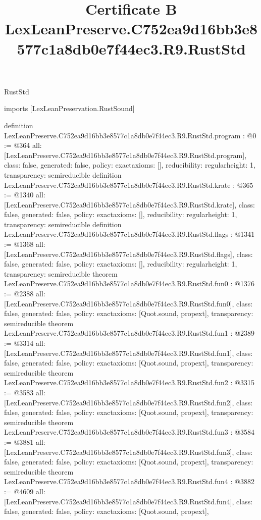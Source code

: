 \begin{lexlean}{RustStd}
\title{Certificate B LexLeanPreserve.C752ea9d16bb3e8577c1a8db0e7f44ec3.R9.RustStd}
\begin{coremodule}
imports [LexLeanPreservation.RustSound]

definition LexLeanPreserve.C752ea9d16bb3e8577c1a8db0e7f44ec3.R9.RustStd.program : @0 := @364 {
  all: [LexLeanPreserve.C752ea9d16bb3e8577c1a8db0e7f44ec3.R9.RustStd.program],
  class: false,
  generated: false,
  policy: exact{axioms: []},
  reducibility: regular{height: 1},
  transparency: semireducible
}
definition LexLeanPreserve.C752ea9d16bb3e8577c1a8db0e7f44ec3.R9.RustStd.krate : @365 := @1340 {
  all: [LexLeanPreserve.C752ea9d16bb3e8577c1a8db0e7f44ec3.R9.RustStd.krate],
  class: false,
  generated: false,
  policy: exact{axioms: []},
  reducibility: regular{height: 1},
  transparency: semireducible
}
definition LexLeanPreserve.C752ea9d16bb3e8577c1a8db0e7f44ec3.R9.RustStd.flags : @1341 := @1368 {
  all: [LexLeanPreserve.C752ea9d16bb3e8577c1a8db0e7f44ec3.R9.RustStd.flags],
  class: false,
  generated: false,
  policy: exact{axioms: []},
  reducibility: regular{height: 1},
  transparency: semireducible
}
theorem LexLeanPreserve.C752ea9d16bb3e8577c1a8db0e7f44ec3.R9.RustStd.fun0 : @1376 := @2388 {
  all: [LexLeanPreserve.C752ea9d16bb3e8577c1a8db0e7f44ec3.R9.RustStd.fun0],
  class: false,
  generated: false,
  policy: exact{axioms: [Quot.sound, propext]},
  transparency: semireducible
}
theorem LexLeanPreserve.C752ea9d16bb3e8577c1a8db0e7f44ec3.R9.RustStd.fun1 : @2389 := @3314 {
  all: [LexLeanPreserve.C752ea9d16bb3e8577c1a8db0e7f44ec3.R9.RustStd.fun1],
  class: false,
  generated: false,
  policy: exact{axioms: [Quot.sound, propext]},
  transparency: semireducible
}
theorem LexLeanPreserve.C752ea9d16bb3e8577c1a8db0e7f44ec3.R9.RustStd.fun2 : @3315 := @3583 {
  all: [LexLeanPreserve.C752ea9d16bb3e8577c1a8db0e7f44ec3.R9.RustStd.fun2],
  class: false,
  generated: false,
  policy: exact{axioms: [Quot.sound, propext]},
  transparency: semireducible
}
theorem LexLeanPreserve.C752ea9d16bb3e8577c1a8db0e7f44ec3.R9.RustStd.fun3 : @3584 := @3881 {
  all: [LexLeanPreserve.C752ea9d16bb3e8577c1a8db0e7f44ec3.R9.RustStd.fun3],
  class: false,
  generated: false,
  policy: exact{axioms: [Quot.sound, propext]},
  transparency: semireducible
}
theorem LexLeanPreserve.C752ea9d16bb3e8577c1a8db0e7f44ec3.R9.RustStd.fun4 : @3882 := @4609 {
  all: [LexLeanPreserve.C752ea9d16bb3e8577c1a8db0e7f44ec3.R9.RustStd.fun4],
  class: false,
  generated: false,
  policy: exact{axioms: [Quot.sound, propext]},
}
\end{coremodule}
\end{lexlean}
